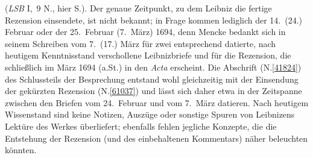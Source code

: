 \begin{ledgroup}
(\cite{02097}\textit{LSB} I,~9 N., hier S.).
Der genaue Zeitpunkt, zu dem Leibniz die fertige Rezension einsendete, ist nicht bekannt; 
in Frage kommen lediglich der 14.~(24.) Februar oder der 25.~Februar (7.~März) 1694, denn Mencke bedankt sich in seinem \cite{02098}Schreiben vom 7.~(17.) März für zwei entsprechend datierte, nach heutigem Kenntnisstand verschollene Leibnizbriefe
und für die Rezension, die schließlich im März 1694 (a.\:St.) in den \cite{01023}\textit{Acta} erscheint.
Die Abschrift (N.\;\ref{41824}) des Schlussteils der Besprechung entstand wohl gleichzeitig mit der Einsendung der gekürzten Rezension (N.\;\ref{61037}) und lässt sich daher etwa in der Zeitspanne zwischen den Briefen vom 24.~Februar und vom 7.~März datieren.
\pend
\pstart
Nach heutigem Wissenstand sind keine Notizen, Auszüge oder sonstige Spuren von Leibnizens Lektüre des Werkes überliefert; ebenfalls fehlen jegliche Konzepte, die die Entstehung der Rezension (und des einbehaltenen Kommentars) näher beleuchten könnten.
\pend 
\end{ledgroup}

